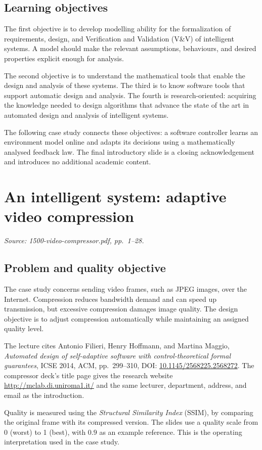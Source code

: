 \documentclass[11pt,a4paper]{article}
\numberwithin{equation}{section}
\numberwithin{figure}{section}
\numberwithin{table}{section}
\newcommand{\source}[1]{\par{\small\color{muted}\textit{Source: #1.}}\par}
\newcommand{\module}[2]{\clearpage\section{#1}\source{#2}}
\begin{document}
\subsection{Learning objectives}
The first objective is to develop modelling ability for the formalization of requirements, design, and Verification and Validation (V\&V) of intelligent systems. A model should make the relevant assumptions, behaviours, and desired properties explicit enough for analysis.

The second objective is to understand the mathematical tools that enable the design and analysis of these systems. The third is to know software tools that support automatic design and analysis. The fourth is research-oriented: acquiring the knowledge needed to design algorithms that advance the state of the art in automated design and analysis of intelligent systems.

The following case study connects these objectives: a software controller learns an environment model online and adapts its decisions using a mathematically analysed feedback law. The final introductory slide is a closing acknowledgement and introduces no additional academic content.

\module{An intelligent system: adaptive video compression}{1500-video-compressor.pdf, pp.\ 1--28}
\subsection{Problem and quality objective}
The case study concerns sending video frames, such as JPEG images, over the Internet. Compression reduces bandwidth demand and can speed up transmission, but excessive compression damages image quality. The design objective is to adjust compression automatically while maintaining an assigned quality level.

The lecture cites Antonio Filieri, Henry Hoffmann, and Martina Maggio, \emph{Automated design of self-adaptive software with control-theoretical formal guarantees}, ICSE 2014, ACM, pp.\ 299--310, DOI: \href{https://doi.org/10.1145/2568225.2568272}{10.1145/2568225.2568272}. The compressor deck's title page gives the research website \url{http://mclab.di.uniroma1.it/} and the same lecturer, department, address, and email as the introduction.

Quality is measured using the \emph{Structural Similarity Index} (SSIM), by comparing the original frame with its compressed version. The slides use a quality scale from 0 (worst) to 1 (best), with $0.9$ as an example reference. This is the operating interpretation used in the case study.
\end{document}
